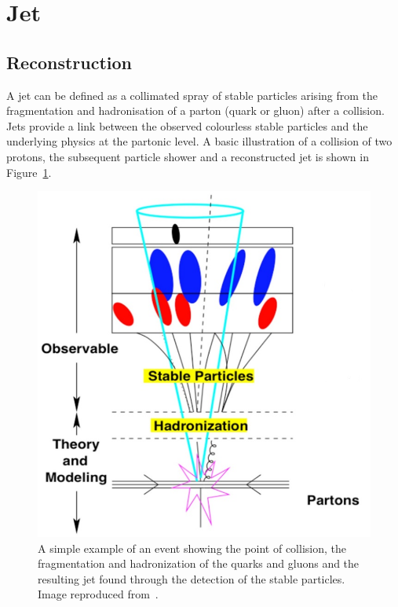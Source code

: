 \section{Jet}
\label{sec:jet} 
\subsection{Reconstruction}
\large
A jet can be defined as a collimated spray 
of stable particles arising from the fragmentation
and hadronisation of a parton (quark or gluon) after a collision.
Jets provide a link between the observed colourless 
stable particles and the underlying physics at the partonic
level. A basic illustration of a collision of two protons,
the subsequent particle shower and a reconstructed jet is 
shown in Figure~\ref{fig:jets}.

\begin{figure}[bht]
    \begin{centering}	
    \includegraphics[width=.6\textwidth]{Reconstruction_plots/Jets.jpg}
    \caption{A simple example of an event showing the point of collision, 
    the fragmentation and hadronization of the quarks and gluons and the 
    resulting jet found through the detection of the stable particles. 
    Image reproduced from~\cite{atkin2015review}.
        }
    \label{fig:jets}
    \end{centering}
\end{figure}

